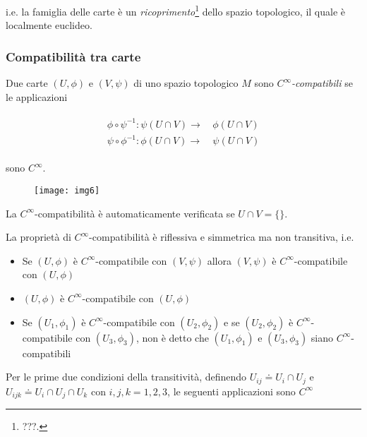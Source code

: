 i.e. la famiglia delle carte è un \textit{ricoprimento}\footnote{%
	???.%
} dello spazio topologico, il quale è localmente euclideo.

\subsubsection{Compatibilità tra carte}

Due carte $ (U,\phi) $ e $ (V,\psi) $ di uno spazio topologico $ M $ sono $ C^{\infty} $\textit{-compatibili} se le applicazioni

\begin{align}
	\begin{split}
		\phi \circ \psi^{-1} : \psi(U \cap V) \to& \, \phi(U \cap V)\\
		\psi \circ \phi^{-1} : \phi(U \cap V) \to& \, \psi(U \cap V)
	\end{split}
\end{align}

sono $ C^{\infty} $.

\begin{figure}[H]
	\centering
	\texttt{[image: img6]}
\end{figure}

\begin{remark}
	La $ C^{\infty} $-compatibilità è automaticamente verificata se $ U \cap V = \{\} $.
\end{remark}

\begin{remark}
	La proprietà di $ C^{\infty} $-compatibilità è riflessiva e simmetrica ma non transitiva, i.e.
	
	\begin{itemize}
		\item Se $ (U,\phi) $ è $ C^{\infty} $-compatibile con $ (V,\psi) $ allora $ (V,\psi) $ è $ C^{\infty} $-compatibile con $ (U,\phi) $
		
		\item $ (U,\phi) $ è $ C^{\infty} $-compatibile con $ (U,\phi) $
		
		\item Se $ (U_{1},\phi_{1}) $ è $ C^{\infty} $-compatibile con $ (U_{2},\phi_{2}) $ e se $ (U_{2},\phi_{2}) $ è $ C^{\infty} $-compatibile con $ (U_{3},\phi_{3}) $, non è detto che $ (U_{1},\phi_{1}) $ e $ (U_{3},\phi_{3}) $ siano $ C^{\infty} $-compatibili
	\end{itemize}
\end{remark}

Per le prime due condizioni della transitività, definendo $ U_{ij} \doteq U_{i} \cap U_{j} $ e $ U_{ijk} \doteq U_{i} \cap U_{j} \cap U_{k} $ con $ i,j,k=1,2,3 $, le seguenti applicazioni sono $ C^{\infty} $

